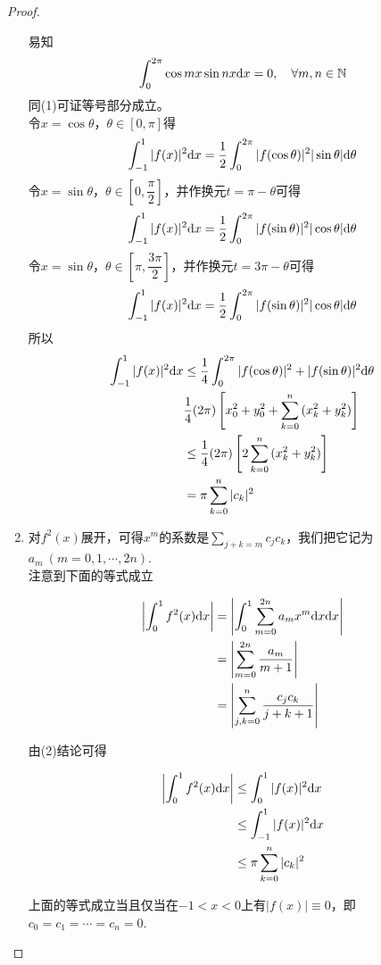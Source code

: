 \begin{proof}
\begin{enumerate}
    易知
    $$\int_{0}^{2\pi}{\cos{mx}\sin{nx}} \mathrm{d} x = 0, \quad \forall m,n \in \mathbb{N}$$
    同\textup{(1)}可证等号部分成立。 \\
    令$x = \cos{\theta}$，$\theta \in [0, \pi]$得
    $$\int_{-1}^{1}{|f(x)|^2}\mathrm{d} x = \dfrac{1}{2} \int_{0}^{2\pi}{|f(\cos{\theta})|^2|\sin{\theta}|}\mathrm{d} \theta$$
    令$x = \sin{\theta}$，$\theta \in \left[ 0, \dfrac{\pi}{2} \right]$，并作换元$t = \pi -\theta$可得
    $$\int_{-1}^{1}{|f(x)|^2}\mathrm{d} x = \dfrac{1}{2} \int_{0}^{2\pi}{|f(\sin{\theta})|^2|\cos{\theta}|}\mathrm{d} \theta$$
    令$x = \sin{\theta}$，$\theta \in \left[ \pi, \dfrac{3\pi}{2} \right]$，并作换元$t = 3\pi -\theta$可得
    $$\int_{-1}^{1}{|f(x)|^2}\mathrm{d} x = \dfrac{1}{2} \int_{0}^{2\pi}{|f(\sin{\theta})|^2|\cos{\theta}|}\mathrm{d} \theta$$
    所以
    \begin{align*}
        \int_{-1}^{1}{|f(x)|^2}\mathrm{d} x & \leq \dfrac{1}{4} \int_{0}^{2\pi}{|f(\cos{\theta})|^2 + |f(\sin{\theta})|^2} \mathrm{d} \theta \\
        & \dfrac{1}{4} (2\pi) \left[ x_0^2 + y_0^2 + \sum\limits_{k = 0}^{n}{(x_k^2 + y_k^2)} \right] \\
        & \leq \dfrac{1}{4} (2\pi) \left[ 2\sum\limits_{k = 0}^{n}{(x_k^2 + y_k^2)} \right] \\
        & = \pi \sum\limits_{k = 0}^{n}{|c_k|^2}
    \end{align*}

    \item 
        对$f^2(x)$展开，可得$x^m$的系数是$\sum\limits_{j + k = m}{c_j c_k}$，我们把它记为$a_m \ (m = 0, 1, \cdots, 2n)$. \\
        注意到下面的等式成立
        
        \begin{align*}
            \left| \int_{0}^{1}{f^2(x)}\mathrm{d} x \right| & =  \left| \int_{0}^{1}{\sum\limits_{m = 0}^{2n}{a_m x^m}}\mathrm{d} x \mathrm{d} x \right| \\
            & =  \left| \sum\limits_{m = 0}^{2n}{\dfrac{a_m}{m + 1}} \right| \\
            & =  \left| \sum\limits_{j, k = 0}^{n}{\dfrac{c_j c_k}{j + k + 1}} \right|
        \end{align*}

        由\textup{(2)}结论可得

        \begin{align*}
            \left| \int_{0}^{1}{f^2(x)}\mathrm{d} x \right| & \leq \int_{0}^{1}{|f(x)|^2}\mathrm{d} x \\
            & \leq \int_{-1}^{1}{|f(x)|^2}\mathrm{d} x \\
            & \leq \pi \sum\limits_{k = 0}^{n}{|c_k|^2}
        \end{align*}

        上面的等式成立当且仅当在$-1 < x < 0$上有$|f(x)| \equiv 0$，即$c_0 = c_1 = \cdots = c_n = 0$. 

    \end{enumerate}

    
\end{proof}

